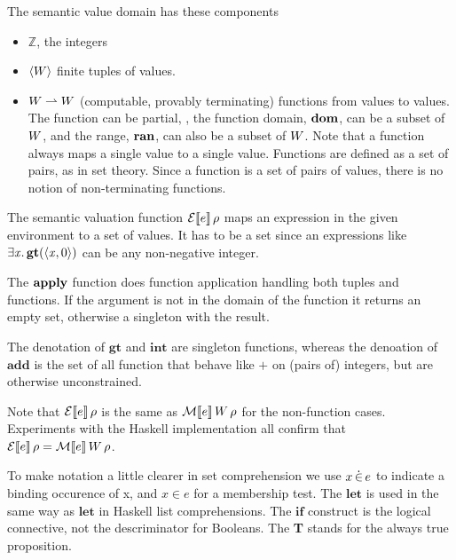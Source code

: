 The semantic value domain has these components
\begin{itemize}
\item $\mathbb{Z}$, the integers
\item $\langle W \rangle$ finite tuples of values.
\item $W \rightharpoonup W$ (computable, provably terminating) functions from values to values.  The function can be partial,
  \ie, the function domain, $\mathbf{dom}$, can be a subset of $W$,
  and the range, $\mathbf{ran}$, can also be a subset of $W$.
  Note that a function always maps a single value to a single value.
  Functions are defined as a set of pairs, as in set theory.
  Since a function is a set of pairs of values, there is no notion of non-terminating functions.
\end{itemize}

The semantic valuation function $\mathcal{E}\llbracket e \rrbracket\, \rho$ maps an expression in the given environment to
a set of values.
It has to be a set since an expressions like \ensuremath{\exists\Varid{x}.\,\textbf{gt}(\langle\Varid{x},\mathrm{0}\rangle)} can be any non-negative integer.

The $\mathbf{apply}$ function does function application handling both tuples and functions.
If the argument is not in the domain of the function it returns an empty set,
otherwise a singleton with the result.

The denotation of \ensuremath{\textbf{gt}} and \ensuremath{\textbf{int}} are singleton functions,
whereas the denoation of \ensuremath{\textbf{add}} is the set of all function that behave like $+$ on (pairs of) integers,
but are otherwise unconstrained.

\vspace{2em}
Note that $\mathcal{E}\llbracket e \rrbracket\, \rho$ is the same as $\mathcal{M}\llbracket e \rrbracket\, W \, \rho$ for the non-function cases.
Experiments with the Haskell implementation all confirm that $\mathcal{E}\llbracket e \rrbracket\, \rho = \mathcal{M}\llbracket e \rrbracket\, W \, \rho$.

To make notation a little clearer in set comprehension we use $x \,\dot{\in}\, e$ to indicate a binding occurence of x,
and $x \in e$ for a membership test.
The \ensuremath{\mathbf{let}} is used in the same way as \ensuremath{\mathbf{let}} in Haskell list comprehensions.
The \ensuremath{\textbf{if}} construct is the logical connective, not the descriminator for Booleans.
The \textbf{T} stands for the always true proposition.

